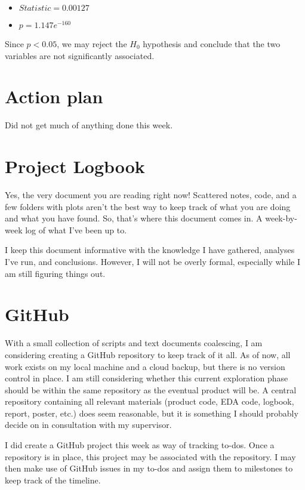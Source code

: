 \begin{center}

\end{center}

\begin{itemize}
    \item $Statistic = 0.00127$
    \item $p = 1.147e^{-160}$
\end{itemize}

Since $p < 0.05$, we may reject the $H_0$ hypothesis and conclude that the two variables are not significantly associated.

\section{Action plan}
Did not get much of anything done this week.

\section{Project Logbook}
Yes, the very document you are reading right now!
Scattered notes, code, and a few folders with plots aren't the best way to keep track of what you are doing and what you have found.
So, that's where this document comes in.
A week-by-week log of what I've been up to.

I keep this document informative with the knowledge I have gathered, analyses I've run, and conclusions.
However, I will not be overly formal, especially while I am still figuring things out.

\section{GitHub}
With a small collection of scripts and text documents coalescing, I am considering creating a GitHub repository to keep track of it all.
As of now, all work exists on my local machine and a cloud backup, but there is no version control in place.
I am still considering whether this current exploration phase should be within the same repository as the eventual product will be.
A central repository containing all relevant materials (product code, EDA code, logbook, report, poster, etc.) does seem reasonable, but it is something I should probably decide on in consultation with my supervisor.

I did create a GitHub project this week as way of tracking to-dos.
Once a repository is in place, this project may be associated with the repository.
I may then make use of GitHub issues in my to-dos and assign them to milestones to keep track of the timeline.
